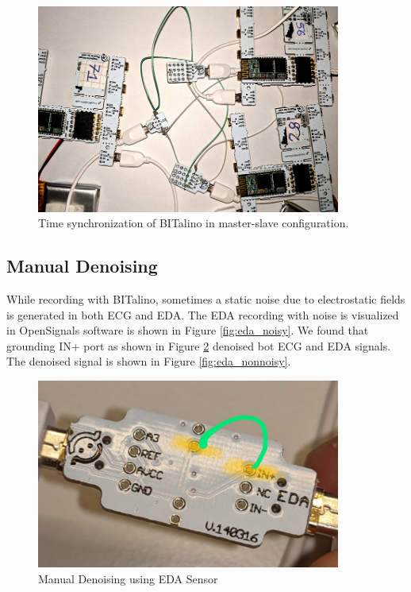 \begin{figure}
\centering
\includegraphics[width=100mm]{Figures/time_syn_bitalino.jpg}
\caption{Time synchronization of BITalino in master-slave configuration.}
\label{fig:time_sync_bitalino}
\end{figure}
\subsection{Manual Denoising}
\label{sec:denoising}
While recording with BITalino, sometimes a static noise due to electrostatic fields is generated in both ECG and EDA. The EDA recording with noise is visualized in OpenSignals software is shown in Figure \ref{fig:eda_noisy}. We found that grounding IN+ port as shown in Figure \ref{fig:eda_denoising} denoised bot ECG and EDA signals. The denoised signal is shown in Figure \ref{fig:eda_nonnoisy}.


\begin{figure}
\centering
\includegraphics[width=100mm]{Figures/eda_denoising.jpeg}
\caption{Manual Denoising using EDA Sensor}
\label{fig:eda_denoising}
\end{figure}

